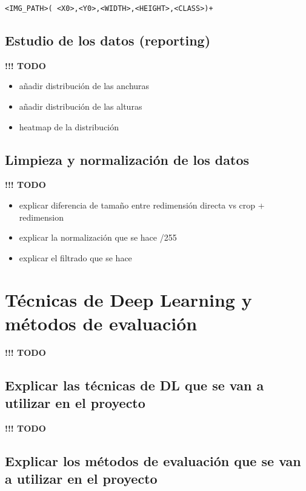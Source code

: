 \documentclass[]{article}
\begin{document}
\begin{lstlisting}[frame=single,basicstyle=\ttfamily\footnotesize]
<IMG_PATH>( <X0>,<Y0>,<WIDTH>,<HEIGHT>,<CLASS>)+
\end{lstlisting}

\subsection{Estudio de los datos (reporting)}

\textbf{!!! TODO}
\begin{itemize}
	\item añadir distribución de las anchuras
	\item añadir distribución de las alturas
	\item heatmap de la distribución
\end{itemize}

\subsection{Limpieza y normalización de los datos}

\textbf{!!! TODO}
\begin{itemize}
	\item explicar diferencia de tamaño entre redimensión directa vs crop + redimension
	\item explicar la normalización que se hace /255
	\item explicar el filtrado que se hace
\end{itemize}

\section{Técnicas de Deep Learning y métodos de evaluación}


\textbf{!!! TODO}

\subsection{Explicar las técnicas de DL que se van a utilizar en el proyecto}


\textbf{!!! TODO}

\subsection{Explicar los métodos de evaluación que se van a utilizar en el proyecto}
\end{document}
